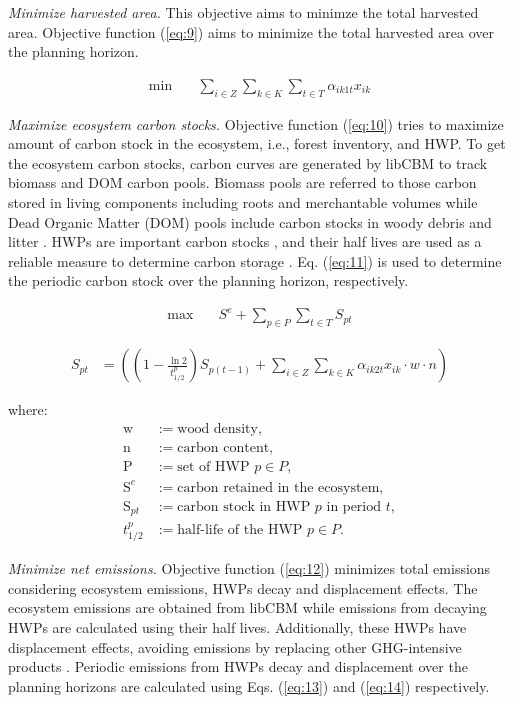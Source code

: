 \documentclass[preprint,12pt]{elsarticle}
\begin{document}
\emph{Minimize harvested area.}
This objective aims to minimze the total harvested area. Objective function (\ref{eq:9}) aims to minimize the total harvested area over the planning horizon.

\begin{align}
       \text{min} & \quad \sum_{i \in Z} \sum_{k \in K} \sum_{t \in T} \alpha_{ik1t} x_{ik} \label{eq:9} 
\end{align}


\emph{Maximize ecosystem carbon stocks.}
Objective function (\ref{eq:10}) tries to maximize amount of carbon stock in the ecosystem, i.e., forest inventory, and HWP. To get the ecosystem carbon stocks, carbon curves are generated by libCBM \citep{libcbmpy} to track biomass and DOM carbon pools. Biomass pools are referred to those carbon stored in living components including roots and merchantable volumes while Dead Organic Matter (DOM) pools include carbon stocks in woody debris and litter \citep{KURZ2009480}.  HWPs are important carbon stocks \citep{geng2017review}, and their half lives are used as a reliable measure to determine carbon storage \citep{braun2016apparent}. Eq. (\ref{eq:11}) is used to determine the periodic carbon stock over the planning horizon, respectively.

\begin{align}
\max \quad & S^{e} + \sum_{p \in P} \sum_{t \in T} S_{pt} \label{eq:10}
\end{align}

\begin{align}
S_{pt} &= \left( \left(1 - \frac{\ln 2}{t_{1/2}^{p}}\right) S_{p(t-1)} + \sum_{i \in Z} \sum_{k \in K} \alpha_{ik2t} x_{ik} \cdot w \cdot n \right) \label{eq:11}
\end{align}

\noindent where:
\begin{align*}
    \text{w} &:= \text{wood density}, \\
    \text{n} &:= \text{carbon content}, \\
    \text{P} &:= \text{set of HWP } p \in P, \\
    \text{S}^{e} &:= \text{carbon retained in the ecosystem}, \\
    \text{S}_{pt} &:= \text{carbon stock in HWP } p \text{ in period } t , \\
    t_{1/2}^{p} &:= \text{half-life of the HWP }p \in P.
\end{align*}

\emph{Minimize net emissions.}
   Objective function (\ref{eq:12}) minimizes total emissions considering ecosystem emissions, HWPs decay and displacement effects.
   The ecosystem emissions are obtained from libCBM \citep{libcbmpy} while emissions from decaying HWPs are calculated using their half lives. Additionally, these HWPs have displacement effects, avoiding emissions by replacing other GHG-intensive products \citep{geng2017review}. Periodic emissions from HWPs decay and displacement over the planning horizons are calculated using Eqs. (\ref{eq:13}) and (\ref{eq:14}) respectively.
   
\end{document}
